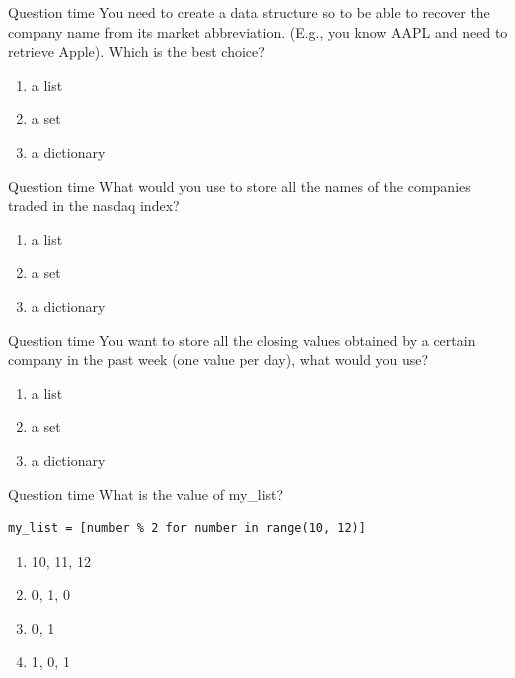 \documentclass[aspectratio=169,handout]{beamer}
\begin{document}
\begin{frame}{Question time}
    You need to create a data structure so to be able to recover the company name from its market abbreviation.
    (E.g., you know AAPL and need to retrieve Apple).
    Which is the best choice?
    \begin{enumerate}
            \item a list
            \item a set
            \item a dictionary
    \end{enumerate}
\end{frame}

\begin{frame}{Question time}
    What would you use to store all the names of the companies traded in the nasdaq index?
    \begin{enumerate}
            \item a list
            \item a set
            \item a dictionary
    \end{enumerate}
\end{frame}

\begin{frame}{Question time}
    You want to store all the closing values obtained by a certain company in the past week (one value per day), what
    would you use?
    \begin{enumerate}
            \item a list
            \item a set
            \item a dictionary
    \end{enumerate}
\end{frame}

\begin{frame}[fragile]{Question time}
    What is the value of my\_list?
    \begin{verbatim}
my_list = [number % 2 for number in range(10, 12)]
    \end{verbatim}
    \begin{enumerate}
        \item  10, 11, 12
        \item  0, 1, 0
        \item  0, 1
        \item  1, 0, 1
    \end{enumerate}
\end{frame}
\end{document}
